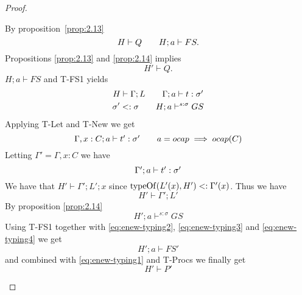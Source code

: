 \begin{proof}
\begin{description}
\begin{description}
\begin{description}
              By proposition~\ref{prop:2.13}
              \begin{equation} 
                H \vdash Q \quad\quad H; a \vdash FS.
              \end{equation}
              Propositions \ref{prop:2.13} and \ref{prop:2.14} implies
              \begin{equation} \label{eq:enew-typing1}
                H' \vdash Q.
              \end{equation}
              $H;a \vdash FS$ and {\sc T-FS1} yields
              \begin{equation}
                \begin{gathered}
                  H \vdash \Gamma; L \quad\quad \mbox{$\Gamma;a\vdash t:\sigma'$}
                  \\
                  \sigma' <: \sigma \quad\quad H;a \vdash^{s: \sigma} GS
                \end{gathered} 
              \end{equation}
              Applying {\sc T-Let} and {\sc T-New} we get
              \begin{equation} \label{eq:enew-typing5}
                \mbox{$\Gamma, x: C;a\vdash t':\sigma'$} \quad\quad a = \mbox{$ocap$}
                \implies \mbox{$ocap$}(C)
              \end{equation}
              Letting $\Gamma' = \Gamma, x: C$ we have
              \begin{equation} \label{eq:enew-typing2}
                \mbox{$\Gamma';a\vdash t':\sigma'$}
              \end{equation}
              We have that $H' \vdash \Gamma';L';x$ since $\mbox{$\mathrm{typeOf}$}(L'(x), H')
              <: \Gamma'(x)$. Thus we have
              \begin{equation} \label{eq:enew-typing3}
                H' \vdash \Gamma'; L'
              \end{equation}
              By proposition \ref{prop:2.14}
              \begin{equation} \label{eq:enew-typing4}
                H';a \vdash^{s: \sigma} GS
              \end{equation}
              Using {\sc T-FS1} together with \eqref{eq:enew-typing2},
              \eqref{eq:enew-typing3} and \eqref{eq:enew-typing4} we get
              \begin{equation}
                H';a \vdash FS'
              \end{equation}
              and combined with \eqref{eq:enew-typing1} and {\sc T-Procs} we finally
              get
              \begin{equation}
                H' \vdash P'
              \end{equation}


\end{description}
\end{description}
\end{description}
\end{proof}
